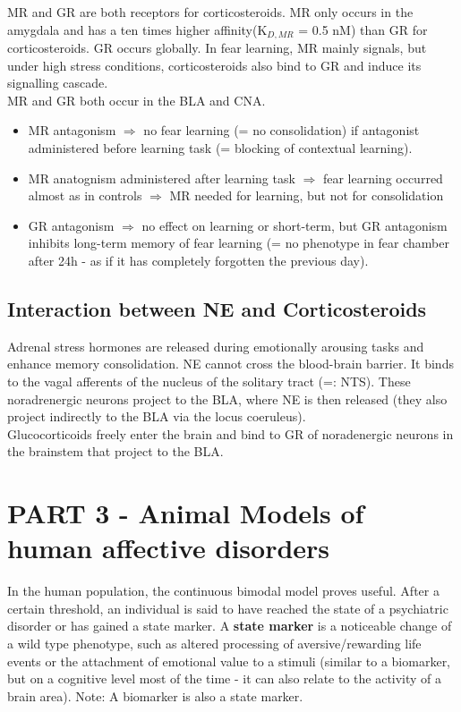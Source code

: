 \documentclass[twosided, a4paper, pt11]{article}
\begin{document}
	MR and GR are both receptors for corticosteroids. MR only occurs in the amygdala and has a ten times higher affinity(K$_{D,MR}$ = 0.5 nM) than GR for corticosteroids. GR occurs globally. In fear learning, MR mainly signals, but under high stress conditions, corticosteroids also bind to GR and induce its signalling cascade.\\
	MR and GR both occur in the BLA and CNA.
	\begin{itemize}
		\item MR antagonism $\Rightarrow$ no fear learning (= no consolidation) if antagonist administered before learning task (= blocking of contextual learning).
		\item MR anatognism administered after learning task $\Rightarrow$ fear learning occurred almost as in controls $\Rightarrow$ MR needed for learning, but not for consolidation
		\item GR antagonism $\Rightarrow$ no effect on learning or short-term, but GR antagonism inhibits long-term memory of fear learning (= no phenotype in fear chamber after 24h - as if it has completely forgotten the previous day).
	\end{itemize}

	\subsection{Interaction between NE and Corticosteroids}
	Adrenal stress hormones are released during emotionally arousing tasks and enhance memory consolidation. NE cannot cross the blood-brain barrier. It binds to the vagal afferents of the nucleus of the solitary tract (=: NTS). These noradrenergic neurons project to the BLA, where NE is then released (they also project indirectly to the BLA via the locus coeruleus).\\
	Glucocorticoids freely enter the brain and bind to GR of noradenergic neurons in the brainstem that project to the BLA.
	
	\section{PART 3 - Animal Models of human affective disorders}
	In the human population, the continuous bimodal model proves useful. After a certain threshold, an individual is said to have reached the state of a psychiatric disorder or has gained a state marker. A \textbf{state marker} is a noticeable change of a wild type phenotype, such as altered processing of aversive/rewarding life events or the attachment of emotional value to a stimuli (similar to a biomarker, but on a cognitive level most of the time - it can also relate to the activity of a brain area). Note: A biomarker is also a state marker.
	
\end{document}

